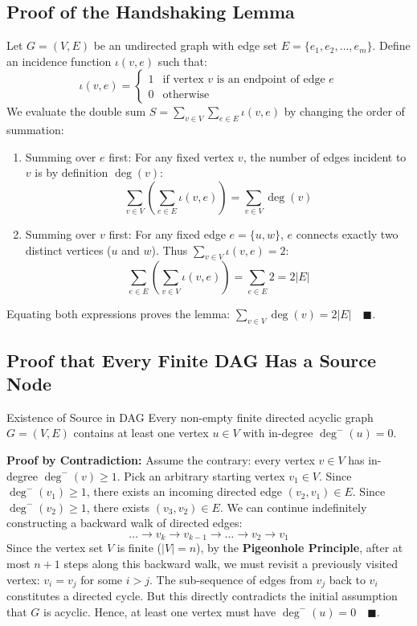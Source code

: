 \subsection{Proof of the Handshaking Lemma}
Let $G = (V, E)$ be an undirected graph with edge set $E = \{e_1, e_2, \dots, e_m\}$. Define an incidence function $\iota(v, e)$ such that:
\begin{equation}
\iota(v, e) = \begin{cases} 1 & \text{if vertex } v \text{ is an endpoint of edge } e \\ 0 & \text{otherwise} \end{cases}
\end{equation}
We evaluate the double sum $S = \sum_{v \in V} \sum_{e \in E} \iota(v, e)$ by changing the order of summation:
\begin{enumerate}
    \item Summing over $e$ first: For any fixed vertex $v$, the number of edges incident to $v$ is by definition $\deg(v)$:
    \begin{equation}
    \sum_{v \in V} \left( \sum_{e \in E} \iota(v, e) \right) = \sum_{v \in V} \deg(v)
    \end{equation}
    \item Summing over $v$ first: For any fixed edge $e = \{u, w\}$, $e$ connects exactly two distinct vertices ($u$ and $w$). Thus $\sum_{v \in V} \iota(v, e) = 2$:
    \begin{equation}
    \sum_{e \in E} \left( \sum_{v \in V} \iota(v, e) \right) = \sum_{e \in E} 2 = 2|E|
    \end{equation}
\end{enumerate}
Equating both expressions proves the lemma: $\sum_{v \in V} \deg(v) = 2|E| \quad \blacksquare$.

\subsection{Proof that Every Finite DAG Has a Source Node}
\begin{theorembox}{Existence of Source in DAG}
Every non-empty finite directed acyclic graph $G = (V, E)$ contains at least one vertex $u \in V$ with in-degree $\deg^-(u) = 0$.
\end{theorembox}
\textbf{Proof by Contradiction:} Assume the contrary: every vertex $v \in V$ has in-degree $\deg^-(v) \ge 1$.
Pick an arbitrary starting vertex $v_1 \in V$. Since $\deg^-(v_1) \ge 1$, there exists an incoming directed edge $(v_2, v_1) \in E$. Since $\deg^-(v_2) \ge 1$, there exists $(v_3, v_2) \in E$. We can continue indefinitely constructing a backward walk of directed edges:
\begin{equation}
\dots \to v_k \to v_{k-1} \to \dots \to v_2 \to v_1
\end{equation}
Since the vertex set $V$ is finite ($|V| = n$), by the \textbf{Pigeonhole Principle}, after at most $n + 1$ steps along this backward walk, we must revisit a previously visited vertex: $v_i = v_j$ for some $i > j$. 
The sub-sequence of edges from $v_j$ back to $v_i$ constitutes a directed cycle. But this directly contradicts the initial assumption that $G$ is acyclic. Hence, at least one vertex must have $\deg^-(u) = 0 \quad \blacksquare$.

